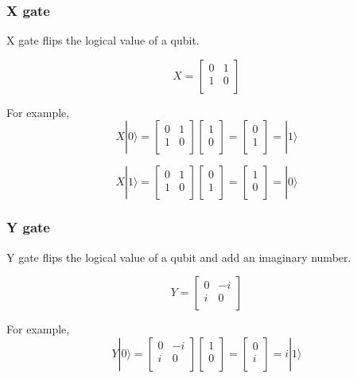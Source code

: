 \subsubsection{X gate}

X gate flips the logical value of a qubit.

$$ X = \begin{bmatrix}
0 & 1 \\
1 & 0 \\
\end{bmatrix}
$$

For example,
$$ X|0\rangle = \begin{bmatrix}
0 & 1 \\
1 & 0 \\
\end{bmatrix} 
\left[
\begin{array}{c}
1 \\
0 \\
\end{array}
\right]
= \left[
\begin{array}{c}
0 \\
1 \\
\end{array}
\right]
= |1\rangle
$$

$$ X|1\rangle = \begin{bmatrix}
0 & 1 \\
1 & 0 \\
\end{bmatrix} 
\left[
\begin{array}{c}
0 \\
1  \\
\end{array}
\right]
= \left[
\begin{array}{c}
1 \\
0 \\
\end{array}
\right]
= |0\rangle
$$

\subsubsection{Y gate}

Y gate flips the logical value of a qubit and add an imaginary number.

$$ Y = \begin{bmatrix}
0 & -i \\
i & 0 \\
\end{bmatrix}
$$

For example,
$$ Y|0\rangle = \begin{bmatrix}
0 & -i \\
i & 0 \\
\end{bmatrix} 
\left[
\begin{array}{c}
1 \\
0 \\
\end{array}
\right]
= \left[
\begin{array}{c}
0 \\
i \\
\end{array}
\right]
= i|1\rangle
$$

